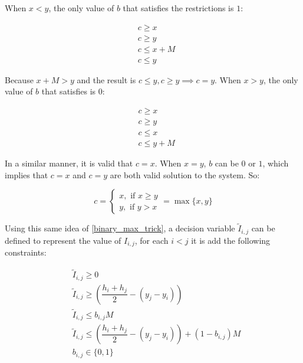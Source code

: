 When $x < y$, the only value of $b$ that satisfies the restrictions is $1$:

\begin{equation*}
    \begin{split}
        &c \geq x \\
        &c \geq y \\
        &c \leq x + M \\
        &c \leq y  
    \end{split}
\end{equation*}

Because $x + M > y$ and the result is $c \leq y, c \geq y \implies c = y$. When $x > y$, the only value of $b$ that satisfies is $0$:

\begin{equation*}
    \begin{split}
        &c \geq x \\
        &c \geq y \\
        &c \leq x  \\
        &c \leq y + M 
    \end{split}
\end{equation*}

In a similar manner, it is valid that $c = x$. When $x = y$, $b$ can be $0$ or $1$, which implies that $c = x$ and $c = y $ are both valid solution to the system. So:

\begin{equation*}
    c = 
    \begin{cases}
      x, \text{ if } x \geq y  \\ 
      y, \text{ if } y > x
    \end{cases}
     = \max \{x, y \}
\end{equation*}

Using this same idea of \ref{binary_max_trick}, a decision variable $\tilde I_{i, j}$ can be defined to represent the value of $I_{i,j}$, for each $i < j$ it is add the following constraints:

\begin{equation}
    \begin{split}
        &\tilde I_{i,j} \geq 0 \\
        &\tilde I_{i,j} \geq \left (
        \dfrac{h_i + h_j}{2} - (y_j - y_i) \right)\\
        &\tilde I_{i,j} \leq b_{i, j}M \\
        &\tilde I_{i,j} \leq \left( \dfrac{h_i + h_j}{2} - (y_j - y_i) \right) + (1- b_{i, j})M \\
        &b_{i, j} \in \{0, 1 \}
    \end{split}
    \label{eq:intersection_trick_constraints}
\end{equation}

